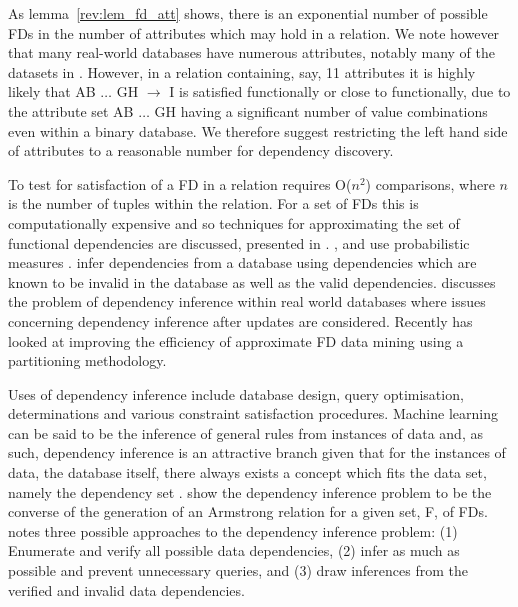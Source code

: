 As lemma~\ref{rev:lem_fd_att} shows, there is an exponential number of
possible FDs in the number of attributes which may hold in a
relation. We note however that many real-world databases have numerous
attributes,  notably many of the datasets in \cite{bkm98}. 
However, in a relation
containing, say, 11 attributes it is highly likely that AB $\ldots$ GH
$\to$ I is satisfied functionally or close to functionally, due to the
attribute set AB $\ldots$ GH having a significant number of value
combinations even within a binary database. We therefore
suggest restricting the left hand side of attributes to a reasonable
number for dependency discovery.

To test for satisfaction of a FD in a
relation requires O($n^2$) comparisons, where $n$ is the number of
tuples within the relation.  For a set of FDs this
is computationally expensive and so techniques for approximating the
set of functional dependencies are discussed, presented in
\cite{mr94,km95,psm93,sf93,schl93,she91}. \cite{schl93}, \cite{sf93}
and \cite{psm93} use probabilistic measures .  \cite{sf93}  
infer dependencies from a database using dependencies which are known to
be invalid in the database as well as the valid
dependencies. \cite{bb95} discusses the problem of dependency
inference within real 
world databases where issues concerning dependency inference after
updates are considered. Recently
\cite{hkp98} has looked at improving the efficiency
of approximate FD data mining using a partitioning methodology.

\medskip

Uses of dependency inference include database design, query optimisation,
determinations and various constraint satisfaction procedures.
 Machine
learning can be said to be the inference of general rules from
instances of data and, as such, dependency inference is an attractive
branch given that for the instances of data, the database itself,
there always exists a concept which fits the data set, namely the
dependency set \cite{mr94}. 
\cite{mr86} show the dependency inference problem to be the converse of
the generation of an Armstrong relation for a given set, F, of
FDs. \cite{bb95} notes three possible approaches
to the dependency 
inference problem: (1) Enumerate and verify all possible data
dependencies, (2) infer as much as possible and prevent unnecessary
queries, and (3) draw inferences from the verified and invalid data
dependencies.


